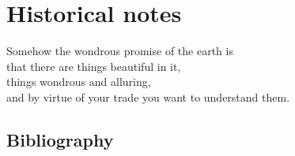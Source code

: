 

\chapter{Historical notes}
\label{c-history}

\begin{bartlett}{
Somehow the wondrous promise of the earth is \\
that there are things beautiful in  it, \\
things wondrous and alluring, \\
and by virtue of your trade you want to understand them. \\
}
\end{bartlett}


\section{Bibliography}
\label{sect:Others}

